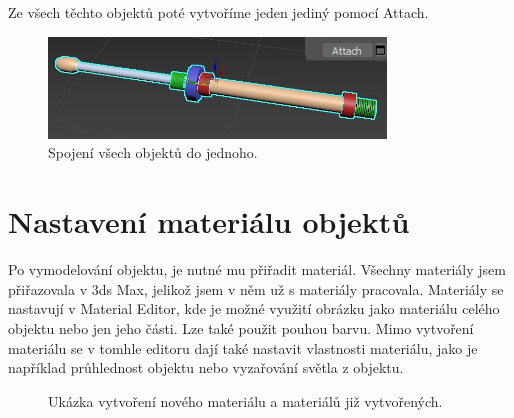\documentclass[12pt, a4paper,
twoside,        %
openright
]{report}
\begin{document}
Ze všech těchto objektů poté vytvoříme jeden jediný pomocí Attach. 

\begin{figure}[h!]
	\centering 
	\includegraphics[width=0.8\textwidth]{image/modelovani10.jpg} 
	\caption{Spojení všech objektů do jednoho.} 
	\label{fig:modelovani_cast6} 
\end{figure}


\clearpage
\section {Nastavení materiálu objektů}
\label{material_objektu}
Po vymodelování objektu, je nutné mu přiřadit materiál. Všechny materiály jsem přiřazovala v 3ds Max, jelikož jsem v něm už s materiály pracovala.  Materiály se nastavují v Material Editor, kde je možné využití obrázku jako materiálu celého objektu nebo jen jeho části. Lze také použit pouhou barvu. Mimo vytvoření materiálu se v tomhle editoru dají také nastavit vlastnosti materiálu, jako je například průhlednost objektu nebo vyzařování světla z objektu.


\begin{figure}[h!]
	\centering
	\qquad
	\caption{Ukázka  vytvoření nového materiálu a materiálů již vytvořených.}
	\label{fig:editor_materialu}
\end{figure}
\end{document}
